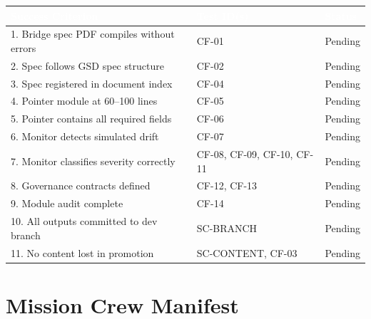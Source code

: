 \documentclass[11pt,letterpaper]{article}
\newcommand{\tableheader}[1]{\textbf{\sffamily\textcolor{white}{#1}}}
\begin{document}
\begin{center}
\begin{tabularx}{\textwidth}{XL{3.5cm}C{1.5cm}}
\toprule
{}
\tableheader{Success Criterion} & \tableheader{Test ID(s)} & \tableheader{Status} \\
. Bridge spec PDF compiles without errors & CF-01 & Pending \\
2. Spec follows GSD spec structure & CF-02 & Pending \\
3. Spec registered in document index & CF-04 & Pending \\
4. Pointer module at 60--100 lines & CF-05 & Pending \\
5. Pointer contains all required fields & CF-06 & Pending \\
6. Monitor detects simulated drift & CF-07 & Pending \\
7. Monitor classifies severity correctly & CF-08, CF-09, CF-10, CF-11 & Pending \\
8. Governance contracts defined & CF-12, CF-13 & Pending \\
9. Module audit complete & CF-14 & Pending \\
10. All outputs committed to dev branch & SC-BRANCH & Pending \\
11. No content lost in promotion & SC-CONTENT, CF-03 & Pending \\
\bottomrule
\end{tabularx}
\end{center}

\section{Mission Crew Manifest}
\end{document}
